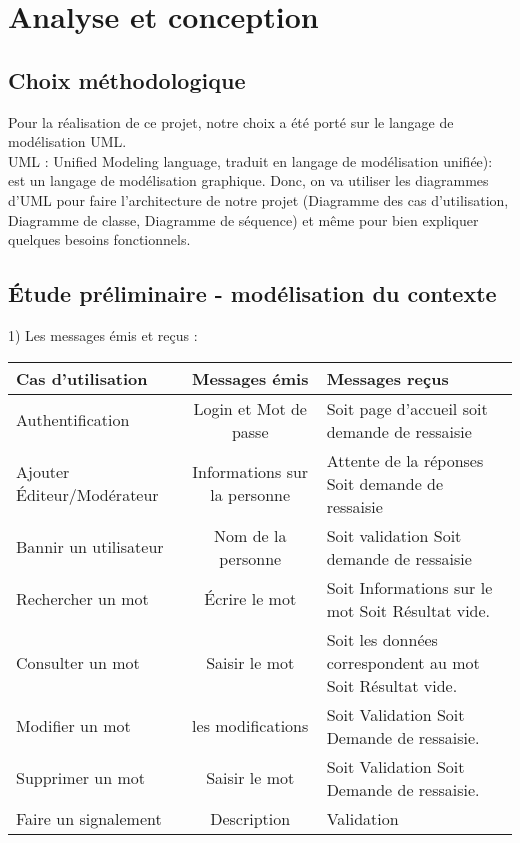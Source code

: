 \documentclass[12pt,a4paper]{article}
\begin{document}
\section{Analyse et conception}

\subsection{Choix méthodologique}

Pour la réalisation de ce projet, notre choix a été porté sur le langage de modélisation UML.\\
UML : Unified Modeling language, traduit en langage de modélisation unifiée): est un langage de modélisation graphique.
Donc, on va utiliser les diagrammes d'UML pour faire l'architecture de notre projet (Diagramme des cas d'utilisation, Diagramme de classe, Diagramme de séquence) et même pour bien expliquer quelques besoins fonctionnels.\\  

\subsection{Étude préliminaire - modélisation du contexte}

1) Les messages émis et reçus : \\

\begin{tabularx}{\textwidth}{|l|c|X|}
  \hline
  \textbf{Cas d'utilisation} & 
  \textbf{Messages émis} & 
  \textbf{Messages reçus} \\
  \hline
  Authentification & 
  Login et Mot de passe & Soit page d'accueil soit demande de ressaisie
  \\ 
   \hline
  \hline
 Ajouter Éditeur/Modérateur & Informations sur la personne & Attente de la réponses Soit demande de ressaisie
    \\
  \hline
  \hline
 Bannir un utilisateur & Nom de la personne  &  Soit validation Soit demande de ressaisie
    \\
  \hline
    \hline
 Rechercher un mot & Écrire le mot &  Soit Informations sur le mot Soit Résultat vide.
    \\
  \hline
   \hline
 Consulter un mot & Saisir le mot &  Soit les données correspondent au mot Soit Résultat vide.
    \\
  \hline
   \hline
 Modifier un mot & les modifications &  Soit Validation  Soit Demande de ressaisie.
    \\
  \hline
    \hline
 Supprimer un mot & Saisir le mot &  Soit Validation  Soit Demande de ressaisie.
    \\
  \hline
      \hline
 Faire un signalement & Description &  Validation
    \\
  \hline
\end{tabularx}
\end{document}
